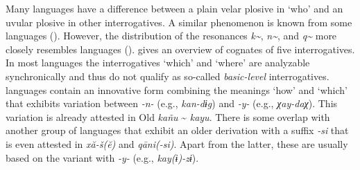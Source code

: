Many  languages have a difference between a plain velar plosive in ‘who’ and an uvular plosive in other interrogatives. A similar phenomenon is known from some  languages (). However, the distribution of the resonances \textit{k{\textasciitilde}}, \textit{n{\textasciitilde}}, and \textit{q{\textasciitilde}} more closely resembles  languages ().  gives an overview of cognates of five  interrogatives. In most languages the interrogatives ‘which’ and ‘where’ are analyzable synchronically and thus do not qualify as so-called \textit{basic-level} interrogatives.  languages contain an innovative form combining the meanings ‘how’ and ‘which’ that exhibits variation between \textit{-n-} (e.g.,  \textit{kan-dɨg}) and \textit{-y-} (e.g.,  \textit{χay-}\textit{daχ}). This variation is already attested in Old  \textit{kañu} {\textasciitilde} \textit{kayu}. There is some overlap with another group of languages that exhibit an older derivation with a suffix \textit{-si} that is even attested in  \textit{xă-š(ĕ)} and  \textit{q\=ani(-si)}. Apart from the latter, these are usually based on the variant with \textit{-y-} (e.g.,  \textit{kay(ɨ)-zɨ}).

